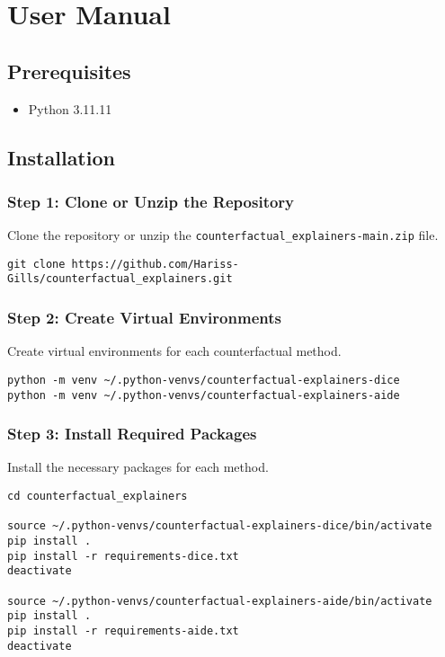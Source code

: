 \chapter{User Manual\label{chap:user-manual}}
\lstset{style=mystyle}
\section{Prerequisites}
\begin{itemize}
    \item Python 3.11.11
\end{itemize}

\section{Installation}
\subsection{Step 1: Clone or Unzip the Repository}
Clone the repository or unzip the \texttt{counterfactual\_explainers-main.zip} file.
\begin{lstlisting}[style=shell]
git clone https://github.com/Hariss-Gills/counterfactual_explainers.git
\end{lstlisting}

\subsection{Step 2: Create Virtual Environments}
Create virtual environments for each counterfactual method.
\begin{lstlisting}[style=shell]
python -m venv ~/.python-venvs/counterfactual-explainers-dice
python -m venv ~/.python-venvs/counterfactual-explainers-aide
\end{lstlisting}

\subsection{Step 3: Install Required Packages}
Install the necessary packages for each method.
\begin{lstlisting}[style=shell]
cd counterfactual_explainers

source ~/.python-venvs/counterfactual-explainers-dice/bin/activate
pip install .
pip install -r requirements-dice.txt
deactivate

source ~/.python-venvs/counterfactual-explainers-aide/bin/activate
pip install .
pip install -r requirements-aide.txt
deactivate
\end{lstlisting}

